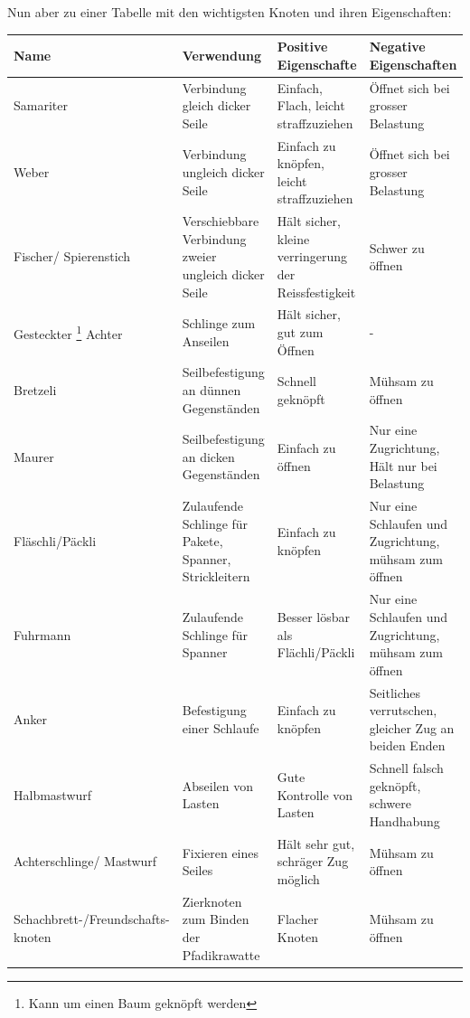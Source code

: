 Nun aber zu einer Tabelle mit den wichtigsten Knoten und ihren Eigenschaften:
\begin{center}
\begin{tabularx}{\textwidth}{X|X|X|X}
    \textbf{Name} & \textbf{Verwendung} & \textbf{Positive Eigenschafte} & \textbf{Negative Eigenschaften} \\\hline
    Samariter & Verbindung gleich dicker Seile & Einfach, Flach, leicht straffzuziehen & Öffnet sich bei grosser Belastung \\\hline
    Weber & Verbindung ungleich dicker Seile & Einfach zu knöpfen, leicht straffzuziehen & Öffnet sich bei grosser Belastung\\\hline
    Fischer/ Spierenstich & Verschiebbare Verbindung zweier ungleich dicker Seile & Hält sicher, kleine verringerung der Reissfestigkeit & Schwer zu öffnen \\\hline
    Gesteckter \footnote{Kann um einen Baum geknöpft werden} Achter & Schlinge zum Anseilen & Hält sicher, gut zum Öffnen & - \\\hline
    Bretzeli & Seilbefestigung an dünnen Gegenständen & Schnell geknöpft & Mühsam zu öffnen \\\hline
    Maurer & Seilbefestigung an dicken Gegenständen & Einfach zu öffnen & Nur eine Zugrichtung, Hält nur bei Belastung \\\hline
    Fläschli/Päckli & Zulaufende Schlinge für Pakete, Spanner, Strickleitern & Einfach zu knöpfen & Nur eine Schlaufen und Zugrichtung, mühsam zum öffnen \\\hline
    Fuhrmann & Zulaufende Schlinge für Spanner & Besser lösbar als Flächli/Päckli & Nur eine Schlaufen und Zugrichtung, mühsam zum öffnen \\\hline
    Anker & Befestigung einer Schlaufe & Einfach zu knöpfen & Seitliches verrutschen, gleicher Zug an beiden Enden \\\hline
    Halbmastwurf & Abseilen von Lasten & Gute Kontrolle von Lasten & Schnell falsch geknöpft, schwere Handhabung \\\hline
    Achterschlinge/ Mastwurf & Fixieren eines Seiles & Hält sehr gut, schräger Zug möglich & Mühsam zu öffnen \\\hline
    Schachbrett-/Freundschafts- knoten & Zierknoten zum Binden der Pfadikrawatte & Flacher Knoten & Mühsam zu öffnen \\
\end{tabularx}
\end{center}

